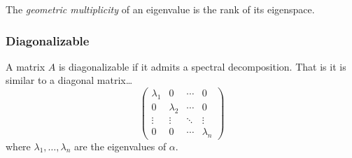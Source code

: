 The \emph{geometric multiplicity} of an eigenvalue is the rank of its eigenspace.

\subsubsection{Diagonalizable}
A matrix $A$ is diagonalizable if it admits a spectral decomposition. That is it is similar to a diagonal matrix\dots
\[
\begin{pmatrix}
\lambda_1 & 0 & \cdots & 0\\
0 & \lambda_2 & \cdots & 0\\
\vdots & \vdots & \ddots & \vdots\\
0 & 0 & \cdots & \lambda_n
\end{pmatrix}
\]
where $\lambda_1, \dots, \lambda_n$ are the eigenvalues of $\alpha$.